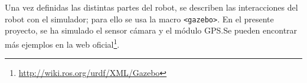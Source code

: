

Una vez definidas las distintas partes del robot, se describen las interacciones del robot con el simulador; para ello se usa la macro \verb|<gazebo>|. En el presente proyecto, se ha simulado el sensor cámara y el módulo \acs{GPS}.Se pueden encontrar más ejemplos en la web oficial\footnote{\url{http://wiki.ros.org/urdf/XML/Gazebo}}.


